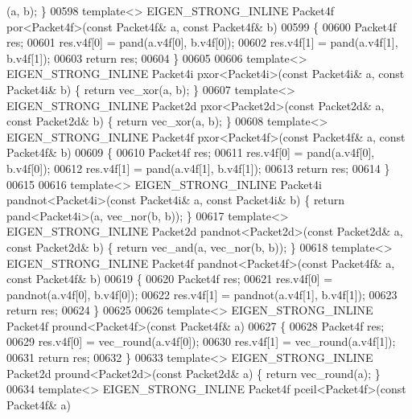 \begin{DoxyCode}
{      (a, b); \}
00598 \textcolor{keyword}{template}<> EIGEN\_STRONG\_INLINE Packet4f por<Packet4f>(\textcolor{keyword}{const} Packet4f& a, \textcolor{keyword}{const} Packet4f& b)
00599 \{
00600   Packet4f res;
00601   res.v4f[0] = pand(a.v4f[0], b.v4f[0]);
00602   res.v4f[1] = pand(a.v4f[1], b.v4f[1]);
00603   \textcolor{keywordflow}{return} res;
00604 \}
00605 
00606 \textcolor{keyword}{template}<> EIGEN\_STRONG\_INLINE Packet4i pxor<Packet4i>(\textcolor{keyword}{const} Packet4i& a, \textcolor{keyword}{const} Packet4i& b) \{ \textcolor{keywordflow}{return} 
      vec\_xor(a, b); \}
00607 \textcolor{keyword}{template}<> EIGEN\_STRONG\_INLINE Packet2d pxor<Packet2d>(\textcolor{keyword}{const} Packet2d& a, \textcolor{keyword}{const} Packet2d& b) \{ \textcolor{keywordflow}{return} 
      vec\_xor(a, b); \}
00608 \textcolor{keyword}{template}<> EIGEN\_STRONG\_INLINE Packet4f pxor<Packet4f>(\textcolor{keyword}{const} Packet4f& a, \textcolor{keyword}{const} Packet4f& b)
00609 \{
00610   Packet4f res;
00611   res.v4f[0] = pand(a.v4f[0], b.v4f[0]);
00612   res.v4f[1] = pand(a.v4f[1], b.v4f[1]);
00613   \textcolor{keywordflow}{return} res;
00614 \}
00615 
00616 \textcolor{keyword}{template}<> EIGEN\_STRONG\_INLINE Packet4i pandnot<Packet4i>(\textcolor{keyword}{const} Packet4i& a, \textcolor{keyword}{const} Packet4i& b) \{ \textcolor{keywordflow}{return} 
      pand<Packet4i>(a, vec\_nor(b, b)); \}
00617 \textcolor{keyword}{template}<> EIGEN\_STRONG\_INLINE Packet2d pandnot<Packet2d>(\textcolor{keyword}{const} Packet2d& a, \textcolor{keyword}{const} Packet2d& b) \{ \textcolor{keywordflow}{return} 
      vec\_and(a, vec\_nor(b, b)); \}
00618 \textcolor{keyword}{template}<> EIGEN\_STRONG\_INLINE Packet4f pandnot<Packet4f>(\textcolor{keyword}{const} Packet4f& a, \textcolor{keyword}{const} Packet4f& b)
00619 \{
00620   Packet4f res;
00621   res.v4f[0] = pandnot(a.v4f[0], b.v4f[0]);
00622   res.v4f[1] = pandnot(a.v4f[1], b.v4f[1]);
00623   \textcolor{keywordflow}{return} res;
00624 \}
00625 
00626 \textcolor{keyword}{template}<> EIGEN\_STRONG\_INLINE Packet4f pround<Packet4f>(\textcolor{keyword}{const} Packet4f& a)
00627 \{
00628   Packet4f res;
00629   res.v4f[0] = vec\_round(a.v4f[0]);
00630   res.v4f[1] = vec\_round(a.v4f[1]);
00631   \textcolor{keywordflow}{return} res;
00632 \}
00633 \textcolor{keyword}{template}<> EIGEN\_STRONG\_INLINE Packet2d pround<Packet2d>(\textcolor{keyword}{const} Packet2d& a) \{ \textcolor{keywordflow}{return} vec\_round(a); \}
00634 \textcolor{keyword}{template}<> EIGEN\_STRONG\_INLINE Packet4f pceil<Packet4f>(\textcolor{keyword}{const}  Packet4f& a)
}
\end{DoxyCode}
